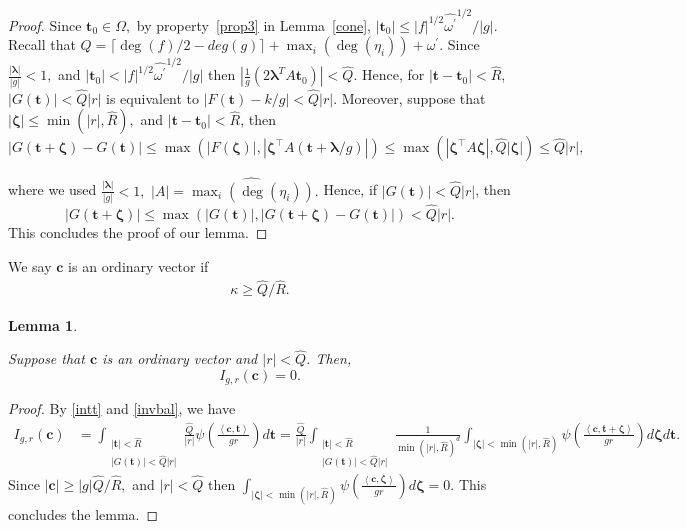 \documentclass[11pt]{amsart}
\theoremstyle{plain}
\theoremstyle{plain}
\newtheorem{lemma}[theorem]{Lemma}
\renewcommand{\vec}[1]{\mathbf{#1}}
\theoremstyle{remark}
\theoremstyle{definition}
\renewcommand{\hat}{\widehat}
\newcommand{\hQ}{\widehat{Q}}
\newcommand{\hR}{\widehat{R}}
\begin{document}
\begin{proof}
Since $\vec{t}_0\in \Omega,$ by property~\eqref{prop3} in Lemma~\ref{cone}, $|\vec{t}_0|\leq |f|^{1/2} \hat{\omega^{\prime}}^{1/2}/|g|.$ Recall that  $Q=  \lceil{\deg(f)/2} -deg(g)\rceil +\max_{i}(\deg(\eta_i))+\omega^{\prime}.$ Since  $\frac{|\boldsymbol{\lambda}|}{|g|}< 1,$ and $|\vec{t}_0|<|f|^{1/2} \hat{\omega^{\prime}}^{1/2}/|g|$ then   $|\frac{1}{g}(2\boldsymbol{\lambda}^T A\vec{t}_0)| <\hQ.$ Hence,  for $|\vec{t}-\vec{t}_0|<\hR$, $|G(\vec{t})| < \hQ|r|$ is equivalent to $|F(\vec{t})-k/g|<\hQ |r|.$ Moreover, suppose that $|\boldsymbol{\zeta}| \leq \min(|r|,\hR),$ and $|\vec{t}-\vec{t}_0|<  \hR$, then 
\[
|G(\vec{t}+\boldsymbol{\zeta})-G(\vec{t})| \leq \max\left( |F(\boldsymbol{\zeta})| ,|\boldsymbol{\zeta}^{\intercal}A(\vec{t}+\boldsymbol{\lambda}/g)|\right) \leq \max(|\boldsymbol{\zeta}^{\intercal}A\boldsymbol{\zeta}|,\hQ|\boldsymbol{\zeta}|)\leq \hQ |r|,
\]

where we used  $\frac{|\boldsymbol{\lambda}|}{|g|}<1 ,$ $|A|= \widehat{\max_{i}(\deg(\eta_i))}.$ Hence, if $|G(\vec{t})|< \hQ|r|$, then
  \begin{equation}\label{invbal}|G(\vec{t}+\boldsymbol{\zeta})| \leq \max(|G(\vec{t})|, |G(\vec{t}+\boldsymbol{\zeta})-G(\vec{t})| )  < \hQ|r|.
  \end{equation}
This concludes the proof of our lemma.
\end{proof}
We say  $\vec{c}$ is an ordinary vector if 
\begin{eqnarray}\label{typeI}
\kappa \geq \hQ/\hR.
\end{eqnarray}
\begin{lemma}\label{o}
 
Suppose that $\vec{c}$ is an ordinary vector and $|r| <\hQ$. Then, \begin{equation}\label{type1}
I_{g,r}(\vec{c})=0.
\end{equation}
\end{lemma}
\begin{proof}
By \eqref{intt} and  \eqref{invbal}, we have \begin{equation*}
\begin{split}
I_{g,r}(\vec{c})&=\int_{\substack{|\vec{t}| < \hR \\ |G(\vec{t})|< \hQ|r|}} \frac{\hQ}{|r|}  \psi\left(\frac{\left< \vec{c},\vec{t} \right>}{gr}    \right) d\vec{t}= \frac{\hQ}{|r|} \int_{\substack{|\vec{t}| < \hR \\ |G(\vec{t})|< \hQ|r|}} \frac{1}{\min(|r|,\hR)^d} \int_{|\boldsymbol\zeta|<  \min(|r|,\hR)}  \psi\left(\frac{\left< \vec{c},\vec{t}+\boldsymbol{\zeta} \right>}{gr}    \right) d\boldsymbol\zeta d\vec{t}.
\end{split}
\end{equation*}
Since  $|\vec{c}|\geq |g|\hQ/\hR,$ and $|r| <\hQ$  then 
\(
 \int_{|\boldsymbol\zeta|< \min(|r|,\hR)}  \psi\left(\frac{\left< \vec{c},\boldsymbol{\zeta} \right>}{gr}    \right) d\boldsymbol\zeta=0.
\) This concludes the lemma. 
\end{proof}
\end{document}
